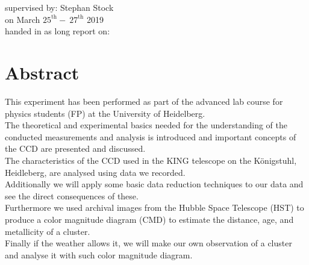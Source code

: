 \begin{center}
	\makeatletter
	\thispagestyle{empty}
	\null\vspace{15mm}
	\Huge\textbf{\@title} \\
	\vspace{14mm}
	\Large  \textbf{\@author} \\
	\large supervised by: Stephan Stock\textbf{} \\
	\vspace{4mm}
	\large on March $25^{\text{th}} - \ 27^{\text{th}}$ 2019 \\
	\vspace{15mm}
	\large handed in as long report on: \  \@date \\ 
	\makeatother
	\vspace{20mm}
	\section*{Abstract}
\end{center}
This experiment has been performed as part of the advanced lab course for physics students (FP) at the University of Heidelberg.
\vspace{5mm}\\
The theoretical and experimental basics needed for the understanding of the conducted measurements and analysis is introduced and important concepts of the CCD are presented and discussed.
\vspace{5mm}\\
The characteristics of the CCD used in the KING telescope on the Königstuhl, Heidleberg, are analysed using data we recorded.
\vspace{5mm}\\
Additionally we will apply some basic data reduction techniques to our data and see the direct consequences of these.
\vspace{5mm}\\
Furthermore we used archival images from the Hubble Space Telescope (HST) to produce a color magnitude diagram (CMD) to estimate the distance, age, and metallicity of a cluster.
\vspace{5mm}\\
Finally if the weather allows it, we will make our own observation of a cluster and analyse it with such color magnitude diagram.\\
